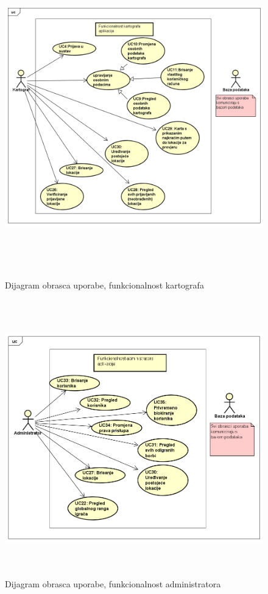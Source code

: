 					\begin{figure}[H]
						\includegraphics[width=\textwidth, height=14cm]{dijagrami/OU_kartograf}
						\centering
						\caption{Dijagram obrasca uporabe, funkcionalnost kartografa}
						\label{fig:promjene2} %
					\end{figure}
				
					\begin{figure}[H]
						\includegraphics[width=\textwidth, height=12cm]{dijagrami/OU_admin} 
						\centering
						\caption{Dijagram obrasca uporabe, funkcionalnost administratora}
						\label{}
					\end{figure}
					
